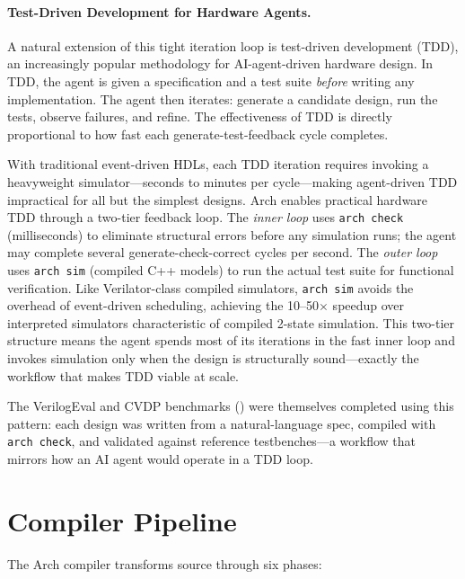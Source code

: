 \documentclass[11pt,twocolumn]{article}
\begin{document}
\paragraph{Test-Driven Development for Hardware Agents.}
A natural extension of this tight iteration loop is test-driven development (TDD), an increasingly popular methodology for AI-agent-driven hardware design. In TDD, the agent is given a specification and a test suite \emph{before} writing any implementation. The agent then iterates: generate a candidate design, run the tests, observe failures, and refine. The effectiveness of TDD is directly proportional to how fast each generate-test-feedback cycle completes.

With traditional event-driven HDLs, each TDD iteration requires invoking a heavyweight simulator---seconds to minutes per cycle---making agent-driven TDD impractical for all but the simplest designs. Arch enables practical hardware TDD through a two-tier feedback loop. The \emph{inner loop} uses \texttt{arch check} (milliseconds) to eliminate structural errors before any simulation runs; the agent may complete several generate-check-correct cycles per second. The \emph{outer loop} uses \texttt{arch sim} (compiled C++ models) to run the actual test suite for functional verification. Like Verilator-class compiled simulators, \texttt{arch sim} avoids the overhead of event-driven scheduling, achieving the 10--50$\times$ speedup over interpreted simulators characteristic of compiled 2-state simulation. This two-tier structure means the agent spends most of its iterations in the fast inner loop and invokes simulation only when the design is structurally sound---exactly the workflow that makes TDD viable at scale.

The VerilogEval and CVDP benchmarks () were themselves completed using this pattern: each design was written from a natural-language spec, compiled with \texttt{arch check}, and validated against reference testbenches---a workflow that mirrors how an AI agent would operate in a TDD loop.

\section{Compiler Pipeline}\label{sec:compiler}

The Arch compiler transforms source through six phases:
\end{document}
